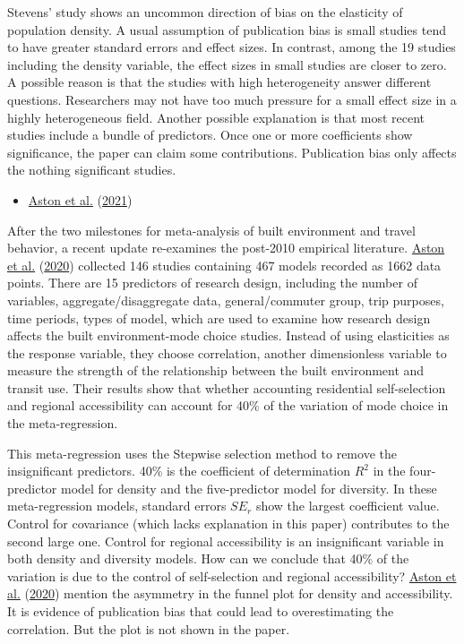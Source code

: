 \documentclass[
  12pt,
]{article}
\providecommand{\tightlist}{%
  \setlength{\itemsep}{0pt}\setlength{\parskip}{0pt}}
\begin{document}
Stevens' study shows an uncommon direction of bias on the elasticity of population density. A usual assumption of publication bias is small studies tend to have greater standard errors and effect sizes. In contrast, among the 19 studies including the density variable, the effect sizes in small studies are closer to zero. A possible reason is that the studies with high heterogeneity answer different questions. Researchers may not have too much pressure for a small effect size in a highly heterogeneous field. Another possible explanation is that most recent studies include a bundle of predictors. Once one or more coefficients show significance, the paper can claim some contributions. Publication bias only affects the nothing significant studies.

\begin{itemize}
\tightlist
\item
  \protect\hyperlink{ref-astonExploringBuiltEnvironment2021}{Aston et al.} (\protect\hyperlink{ref-astonExploringBuiltEnvironment2021}{2021})
\end{itemize}

After the two milestones for meta-analysis of built environment and travel behavior, a recent update re-examines the post-2010 empirical literature. \protect\hyperlink{ref-astonStudyDesignImpacts2020}{Aston et al.} (\protect\hyperlink{ref-astonStudyDesignImpacts2020}{2020}) collected 146 studies containing 467 models recorded as 1662 data points. There are 15 predictors of research design, including the number of variables, aggregate/disaggregate data, general/commuter group, trip purposes, time periods, types of model, which are used to examine how research design affects the built environment-mode choice studies. Instead of using elasticities as the response variable, they choose correlation, another dimensionless variable to measure the strength of the relationship between the built environment and transit use. Their results show that whether accounting residential self-selection and regional accessibility can account for 40\% of the variation of mode choice in the meta-regression.

This meta-regression uses the Stepwise selection method to remove the insignificant predictors. 40\% is the coefficient of determination \(R^2\) in the four-predictor model for density and the five-predictor model for diversity. In these meta-regression models, standard errors \(SE_r\) show the largest coefficient value. Control for covariance (which lacks explanation in this paper) contributes to the second large one. Control for regional accessibility is an insignificant variable in both density and diversity models. How can we conclude that 40\% of the variation is due to the control of self-selection and regional accessibility? \protect\hyperlink{ref-astonStudyDesignImpacts2020}{Aston et al.} (\protect\hyperlink{ref-astonStudyDesignImpacts2020}{2020}) mention the asymmetry in the funnel plot for density and accessibility. It is evidence of publication bias that could lead to overestimating the correlation. But the plot is not shown in the paper.
\end{document}
